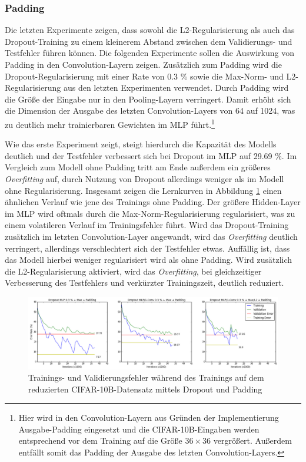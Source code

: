 \subsubsection{Padding}
Die letzten Experimente zeigen, dass sowohl die L2-Regularisierung als auch das Dropout-Training zu einem kleinerem Abstand zwischen dem Validierungs- und Testfehler führen können. Die folgenden Experimente sollen die Auswirkung von Padding in den Convolution-Layern zeigen. Zusätzlich zum Padding wird die Dropout-Regularisierung mit einer Rate von 0.3 \% sowie die Max-Norm- und L2-Regularisierung aus den letzten Experimenten verwendet.
Durch Padding wird die Größe der Eingabe nur in den Pooling-Layern verringert. Damit erhöht sich die Dimension der Ausgabe des letzten Convolution-Layers von 64 auf 1024, was zu deutlich mehr trainierbaren Gewichten im MLP führt.\footnote{Hier wird in den Convolution-Layern aus Gründen der Implementierung Ausgabe-Padding eingesetzt und die CIFAR-10B-Eingaben werden entsprechend vor dem Training auf die Größe $36 \times 36$ vergrößert. Außerdem entfällt somit das Padding der Ausgabe des letzten Convolution-Layers.}

Wie das erste Experiment zeigt, steigt hierdurch die Kapazität des Modells deutlich und der Testfehler verbessert sich bei Dropout im MLP auf 29.69 \%. Im Vergleich zum Modell ohne Padding tritt am Ende außerdem ein größeres \textit{Overfitting} auf, durch Nutzung von Dropout allerdings weniger als im Modell ohne Regularisierung. Insgesamt zeigen die Lernkurven in Abbildung \ref{fig:6_overfit_padding} einen ähnlichen Verlauf wie jene des Trainings ohne Padding. Der größere Hidden-Layer im MLP wird oftmals durch die Max-Norm-Regularisierung regularisiert, was zu einem volatileren Verlauf im Trainingsfehler führt. 
Wird das Dropout-Training zusätzlich im letzten Convolution-Layer angewandt, wird das \textit{Overfitting} deutlich verringert, allerdings verschlechtert sich der Testfehler etwas.
Auffällig ist, dass das Modell hierbei weniger regularisiert wird als ohne Padding. Wird zusätzlich die L2-Regularisierung aktiviert, wird das \textit{Overfitting}, bei gleichzeitiger Verbesserung des Testfehlers und verkürzter Trainingszeit, deutlich reduziert.

\begin{figure}
\centering
\includegraphics[width=0.8\linewidth]{images/6_overfit_padding_2}
\caption[]{Trainings- und Validierungsfehler während des Trainings auf dem reduzierten CIFAR-10B-Datensatz mittels Dropout und Padding}
\label{fig:6_overfit_padding}
\end{figure}


